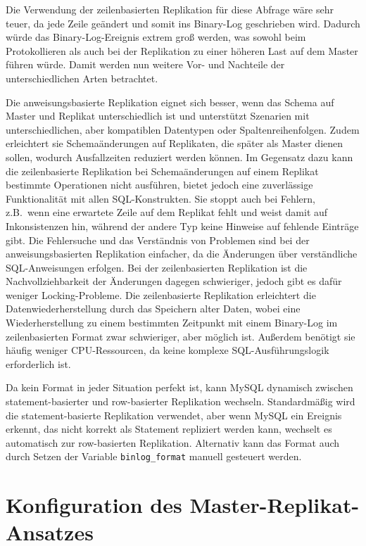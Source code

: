 Die Verwendung der zeilenbasierten Replikation für diese Abfrage wäre sehr teuer, da jede Zeile geändert und somit ins Binary-Log geschrieben wird.
Dadurch würde das Binary-Log-Ereignis extrem groß werden, was sowohl beim Protokollieren als auch bei der Replikation zu einer höheren Last auf dem Master führen würde.
Damit werden nun weitere Vor- und Nachteile der unterschiedlichen Arten betrachtet.

Die anweisungsbasierte Replikation eignet sich besser, wenn das Schema auf Master und Replikat unterschiedlich ist und unterstützt Szenarien mit unterschiedlichen, aber kompatiblen Datentypen oder Spaltenreihenfolgen.
Zudem erleichtert sie Schemaänderungen auf Replikaten, die später als Master dienen sollen, wodurch Ausfallzeiten reduziert werden können.
Im Gegensatz dazu kann die zeilenbasierte Replikation bei Schemaänderungen auf einem Replikat bestimmte Operationen nicht ausführen, bietet jedoch eine zuverlässige Funktionalität mit allen SQL-Konstrukten.
Sie stoppt auch bei Fehlern, z.B.\ wenn eine erwartete Zeile auf dem Replikat fehlt und weist damit auf Inkonsistenzen hin, während der andere Typ keine Hinweise auf fehlende Einträge gibt.
Die Fehlersuche und das Verständnis von Problemen sind bei der anweisungsbasierten Replikation einfacher, da die Änderungen über verständliche SQL-Anweisungen erfolgen.
Bei der zeilenbasierten Replikation ist die Nachvollziehbarkeit der Änderungen dagegen schwieriger, jedoch gibt es dafür weniger Locking-Probleme.
Die zeilenbasierte Replikation erleichtert die Datenwiederherstellung durch das Speichern alter Daten, wobei eine Wiederherstellung zu einem bestimmten Zeitpunkt mit einem Binary-Log im zeilenbasierten Format zwar schwieriger, aber möglich ist.
Außerdem benötigt sie häufig weniger CPU-Ressourcen, da keine komplexe SQL-Ausführungslogik erforderlich ist.

Da kein Format in jeder Situation perfekt ist, kann MySQL dynamisch zwischen statement-basierter und row-basierter Replikation wechseln.
Standardmäßig wird die statement-basierte Replikation verwendet, aber wenn MySQL ein Ereignis erkennt, das nicht korrekt als Statement repliziert werden kann, wechselt es automatisch zur row-basierten Replikation.
Alternativ kann das Format auch durch Setzen der Variable \texttt{binlog\_format} manuell gesteuert werden.

\section{Konfiguration des Master-Replikat-Ansatzes}\label{sec:replication-konfiguration}

